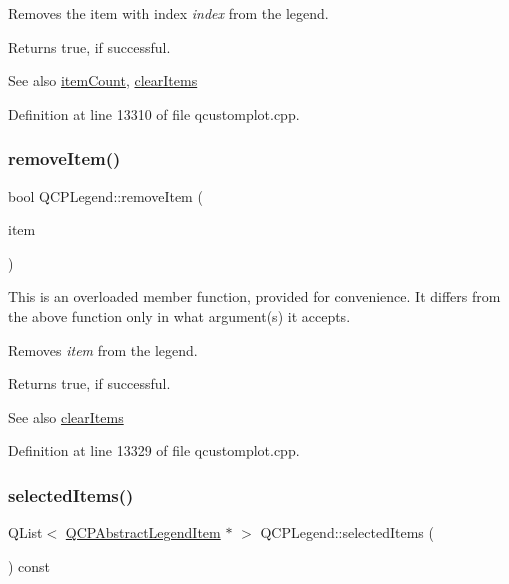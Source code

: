 Removes the item with index {\itshape index} from the legend.

Returns true, if successful.

\begin{DoxySeeAlso}{See also}
\hyperlink{class_q_c_p_legend_a57ab86ab8b2a3762d4c1455eb5452c88}{item\+Count}, \hyperlink{class_q_c_p_legend_a24795c7250eb5214fcea16b7217b4dfb}{clear\+Items} 
\end{DoxySeeAlso}


Definition at line 13310 of file qcustomplot.\+cpp.

\mbox{\label{class_q_c_p_legend_a2aea4ec6da2d454dd0b241a254d65082}} 
\subsubsection{\texorpdfstring{remove\+Item()}{removeItem()}\hspace{0.1cm}{\footnotesize\ttfamily [2/2]}}
{\footnotesize\ttfamily bool Q\+C\+P\+Legend\+::remove\+Item (\begin{DoxyParamCaption}\item[{\hyperlink{class_q_c_p_abstract_legend_item}{Q\+C\+P\+Abstract\+Legend\+Item} $\ast$}]{item }\end{DoxyParamCaption})}

This is an overloaded member function, provided for convenience. It differs from the above function only in what argument(s) it accepts.

Removes {\itshape item} from the legend.

Returns true, if successful.

\begin{DoxySeeAlso}{See also}
\hyperlink{class_q_c_p_legend_a24795c7250eb5214fcea16b7217b4dfb}{clear\+Items} 
\end{DoxySeeAlso}


Definition at line 13329 of file qcustomplot.\+cpp.

\mbox{\label{class_q_c_p_legend_ac7d9e567d5c551e09cd9bcc4306c5532}} 
\subsubsection{\texorpdfstring{selected\+Items()}{selectedItems()}}
{\footnotesize\ttfamily Q\+List$<$ \hyperlink{class_q_c_p_abstract_legend_item}{Q\+C\+P\+Abstract\+Legend\+Item} $\ast$ $>$ Q\+C\+P\+Legend\+::selected\+Items (\begin{DoxyParamCaption}{ }\end{DoxyParamCaption}) const}

